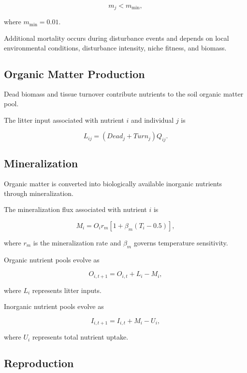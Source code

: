 \begin{equation}
m_j<m_{\min},
\end{equation}

where $m_{\min}=0.01$.

Additional mortality occurs during disturbance events and depends on local environmental conditions, disturbance intensity, niche fitness, and biomass.

\subsection{Organic Matter Production}

Dead biomass and tissue turnover contribute nutrients to the soil organic matter pool.

The litter input associated with nutrient $i$ and individual $j$ is

\begin{equation}
L_{ij}
=
(Dead_j+Turn_j)Q_{ij}.
\end{equation}

\subsection{Mineralization}

Organic matter is converted into biologically available inorganic nutrients through mineralization.

The mineralization flux associated with nutrient $i$ is

\begin{equation}
M_i
=
O_i r_m
\left[
1+\beta_m(T_i-0.5)
\right],
\end{equation}

where $r_m$ is the mineralization rate and $\beta_m$ governs temperature sensitivity.

Organic nutrient pools evolve as

\begin{equation}
O_{i,t+1}
=
O_{i,t}
+
L_i
-
M_i,
\end{equation}

where $L_i$ represents litter inputs.

Inorganic nutrient pools evolve as

\begin{equation}
I_{i,t+1}
=
I_{i,t}
+
M_i
-
U_i,
\end{equation}

where $U_i$ represents total nutrient uptake.

\subsection{Reproduction}

